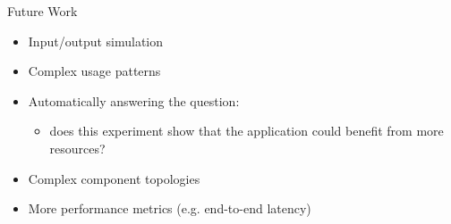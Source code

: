 \documentclass{beamer}
\begin{document}
\begin{frame}{Future Work}
  \begin{itemize}
  \item Input/output simulation
  \item Complex usage patterns
  \item Automatically answering the question:
    \begin{itemize}
    \item does this experiment show that the application could benefit from more
      resources?
    \end{itemize}
  \item Complex component topologies
  \item More performance metrics (e.g. end-to-end latency)
  \end{itemize}
\end{frame}

\end{document}
